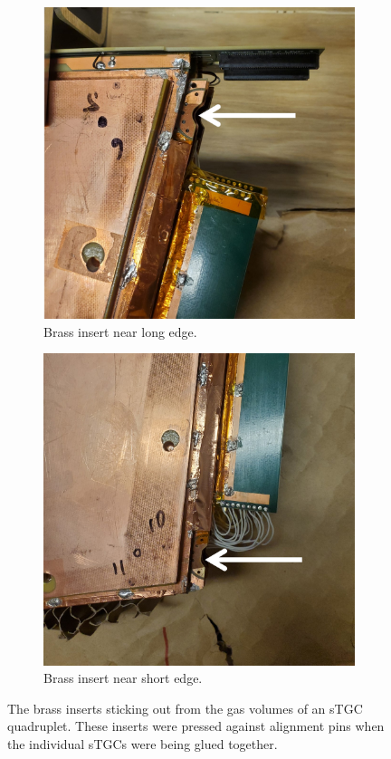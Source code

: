 \begin{figure}
\centering
\begin{subfigure}{.5\textwidth}
  \centering
  \includegraphics[width=\linewidth]{figures/brass_top.jpg}
  \caption{Brass insert near long edge.}
  \label{fig:brass_top}
\end{subfigure}%
\begin{subfigure}{.5\textwidth}
  \centering
  \includegraphics[width=\linewidth]{figures/brass_bottom.jpg}
  \caption{Brass insert near short edge.}
  \label{fig:brass_bottom}
\end{subfigure}
\caption{The brass inserts sticking out from the gas volumes of an sTGC quadruplet. These inserts were pressed against alignment pins when the individual sTGCs were being glued together.}
\label{fig:brasses}
\end{figure}

